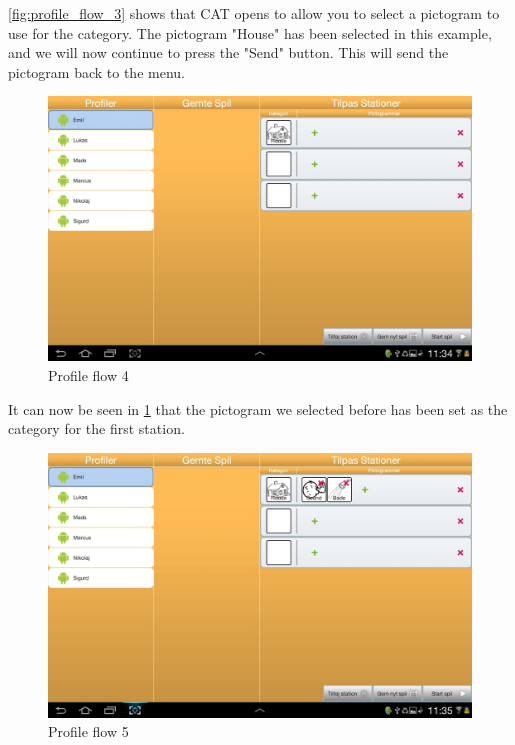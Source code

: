 \ref{fig:profile_flow_3} shows that CAT  opens to allow you to select a pictogram to use for the category.
The pictogram "House" has been selected in this example, and we will now continue to press the "Send" button. This will send the pictogram back to the menu.

\begin{figure}[H]
\centering
\includegraphics[width=0.9\linewidth]{img/screenshots/profile_flow_4.jpg}%
\caption{Profile flow 4}
\label{fig:profile_flow_4}
\end{figure}

It can now be seen in \ref{fig:profile_flow_4} that the pictogram we selected before has been set as the category for the first station.

\begin{figure}[H]
\centering
\includegraphics[width=0.9\linewidth]{img/screenshots/profile_flow_5.jpg}%
\caption{Profile flow 5}
\label{fig:profile_flow_5}
\end{figure}

